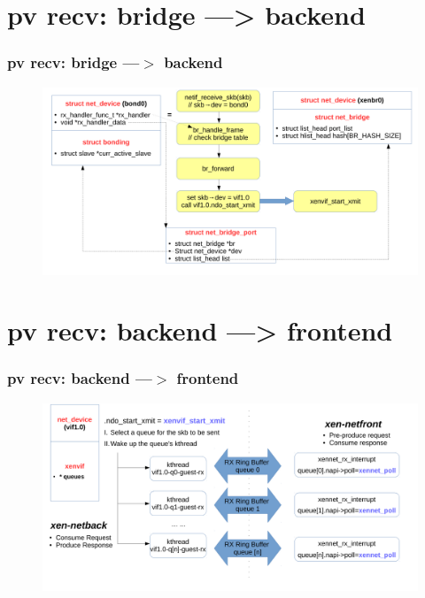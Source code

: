 \documentclass[aspectratio=169]{beamer}
\begin{document}

\section{pv recv: bridge ---> backend}
\begin{frame}
\frametitle{pv recv: bridge ---$>$ backend}
\begin{figure}
\includegraphics[width=1.0\linewidth]{figures/bridge_to_vif.pdf}
\end{figure}
\end{frame}


\section{pv recv: backend ---> frontend}
\begin{frame}
\frametitle{pv recv: backend ---$>$ frontend}
\begin{figure}
\includegraphics[width=1.0\linewidth]{figures/vif_to_eth.pdf}
\end{figure}
\end{frame}
\end{document}
